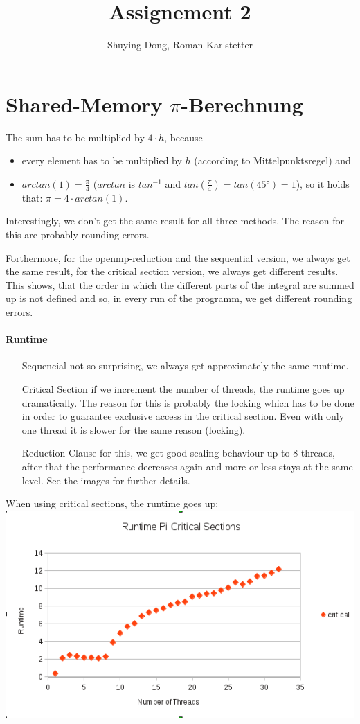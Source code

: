 \documentclass[a4paper,10pt]{article}
\title{Assignement 2}
\author{Shuying Dong, Roman Karlstetter}
\begin{document}
\section{Shared-Memory $\pi$-Berechnung}
The sum has to be multiplied by $4\cdot h$, because
\begin{itemize}
 \item every element has to be multiplied by $h$ (according to Mittelpunktsregel) and
 \item $arctan(1) = \frac{\pi}{4}$ ($arctan$ is $tan^{-1}$ and $tan(\frac{\pi}{4}) = tan(45°) = 1$), so it holds that: $\pi = 4 \cdot arctan(1)$. 
\end{itemize}

Interestingly, we don't get the same result for all three methods. The reason for this are probably rounding errors. 

Forthermore, for the openmp-reduction and the sequential version, we always get the same result, for the critical section version, we always get different results. This shows, that the order in which the different parts of the integral are summed up is not defined and so, in every run of the programm, we get different rounding errors.

\paragraph{Runtime}
\begin{itemize}
 \item[Sequencial] not so surprising, we always get approximately the same runtime.
 \item[Critical Section] if we increment the number of threads, the runtime goes up dramatically. The reason for this is probably the locking which has to be done in order to guarantee exclusive access in the critical section. Even with only one thread it is slower for the same reason (locking).
 \item[Reduction Clause] for this, we get good scaling behaviour up to 8 threads, after that the performance decreases again and more or less stays at the same level. See the images for further details.
\end{itemize}

When using critical sections, the runtime goes up:
\includegraphics[]{pi_critical.png}
\end{document}
